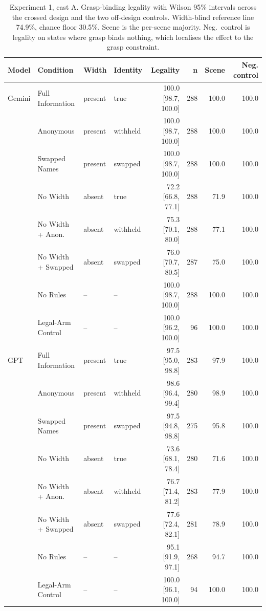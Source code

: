 \begin{table}[H]
  \centering
  \caption{Experiment 1, cast A. Grasp-binding legality with Wilson 95\% intervals across the crossed design and the two off-design controls. Width-blind reference line 74.9\%, chance floor 30.5\%. Scene is the per-scene majority. Neg.\ control is legality on states where grasp binds nothing, which localises the effect to the grasp constraint.}
  \label{tab:ex1:design}
  \small
  \begin{tabular}{llllrrrr}
    \toprule
    Model & Condition & Width & Identity & Legality & n & Scene & Neg. control \\
    \midrule
    Gemini & Full Information & present & true & 100.0 [98.7, 100.0] & 288 & 100.0 & 100.0 \\
     & Anonymous & present & withheld & 100.0 [98.7, 100.0] & 288 & 100.0 & 100.0 \\
     & Swapped Names & present & swapped & 100.0 [98.7, 100.0] & 288 & 100.0 & 100.0 \\
     & No Width & absent & true & 72.2 [66.8, 77.1] & 288 & 71.9 & 100.0 \\
     & No Width + Anon. & absent & withheld & 75.3 [70.1, 80.0] & 288 & 77.1 & 100.0 \\
     & No Width + Swapped & absent & swapped & 76.0 [70.7, 80.5] & 287 & 75.0 & 100.0 \\
     & No Rules & -- & -- & 100.0 [98.7, 100.0] & 288 & 100.0 & 100.0 \\
     & Legal-Arm Control & -- & -- & 100.0 [96.2, 100.0] & 96 & 100.0 & 100.0 \\
    GPT & Full Information & present & true & 97.5 [95.0, 98.8] & 283 & 97.9 & 100.0 \\
     & Anonymous & present & withheld & 98.6 [96.4, 99.4] & 280 & 98.9 & 100.0 \\
     & Swapped Names & present & swapped & 97.5 [94.8, 98.8] & 275 & 95.8 & 100.0 \\
     & No Width & absent & true & 73.6 [68.1, 78.4] & 280 & 71.6 & 100.0 \\
     & No Width + Anon. & absent & withheld & 76.7 [71.4, 81.2] & 283 & 77.9 & 100.0 \\
     & No Width + Swapped & absent & swapped & 77.6 [72.4, 82.1] & 281 & 78.9 & 100.0 \\
     & No Rules & -- & -- & 95.1 [91.9, 97.1] & 268 & 94.7 & 100.0 \\
     & Legal-Arm Control & -- & -- & 100.0 [96.1, 100.0] & 94 & 100.0 & 100.0 \\

\end{tabular}
\end{table}
